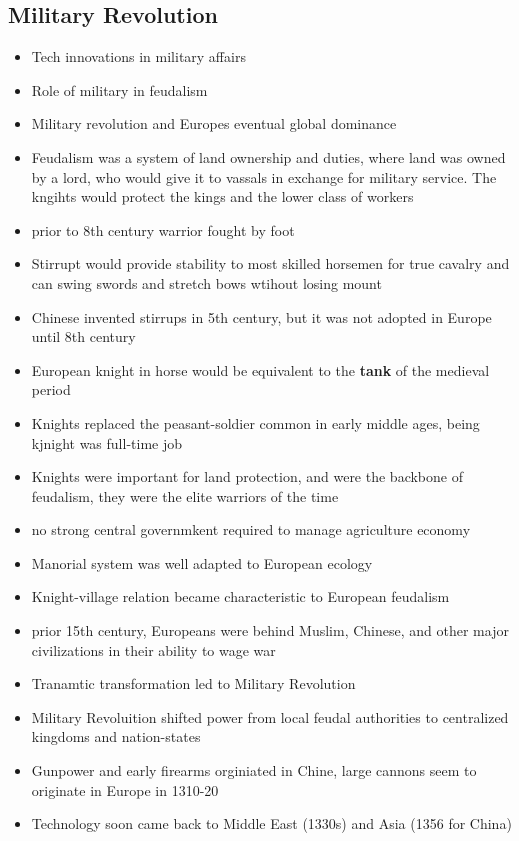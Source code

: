 \documentclass{article}
\begin{document}
\subsection{Military Revolution}
\begin{itemize}
  \item Tech innovations in military affairs
  \item Role of military in feudalism
  \item Military revolution and Europes eventual global
    dominance
  \item Feudalism was a system of land ownership and duties,
    where land was owned by a lord, who would give it to vassals in exchange for military service.
    The kngihts would protect the kings and the lower class of workers
  \item prior to 8th century warrior fought by foot
  \item Stirrupt would provide stability to most skilled horsemen for true cavalry
    and can swing swords and stretch bows wtihout losing mount
  \item Chinese invented stirrups in 5th century,
    but it was not adopted in Europe until 8th century
  \item European knight in horse would be equivalent to the \textbf{tank} of the medieval period
  \item Knights replaced the peasant-soldier common in early middle ages, being
    kjnight was full-time job
  \item Knights were important for land protection, and were
    the backbone of feudalism, they were the elite warriors of the time
  \item no strong central governmkent required to manage agriculture economy
  \item Manorial system was well adapted to European ecology
  \item Knight-village relation became characteristic to European feudalism
  \item prior 15th century, Europeans were behind Muslim, Chinese, and other major civilizations
    in their ability to wage war
  \item Tranamtic transformation led to Military Revolution
  \item Military Revoluition shifted power from local feudal authorities
    to centralized kingdoms and nation-states
  \item Gunpower and early firearms orginiated in Chine,
    large cannons seem to originate in Europe in 1310-20
  \item Technology soon came back to Middle East (1330s) and Asia (1356 for China)

\end{itemize}
\end{document}
